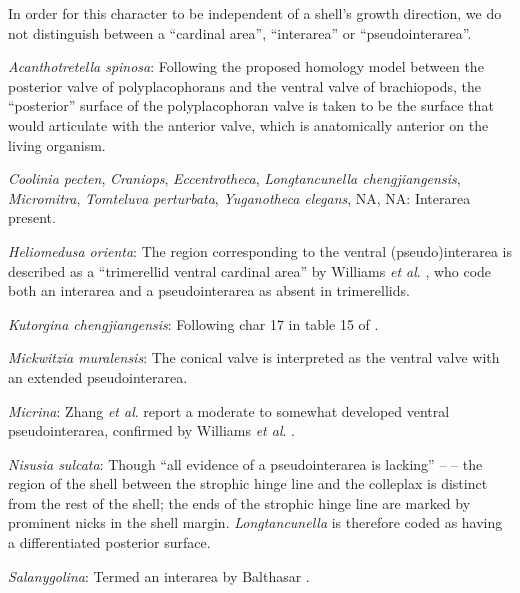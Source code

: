 \documentclass[openany]{book}
\theoremstyle{definition}
\theoremstyle{definition}
\theoremstyle{definition}
\theoremstyle{remark}
\begin{document}
In order for this character to be independent of a shell's growth
direction, we do not distinguish between a ``cardinal area'',
``interarea'' or ``pseudointerarea''.

\hypertarget{Acanthotretella_spinosa-coding-101}{}
\emph{Acanthotretella spinosa}: Following the proposed homology model
between the posterior valve of polyplacophorans and the ventral valve of
brachiopods, the ``posterior'' surface of the polyplacophoran valve is
taken to be the surface that would articulate with the anterior valve,
which is anatomically anterior on the living organism.

\hypertarget{Coolinia_pecten-coding-101}{}
\emph{Coolinia pecten}, \emph{Craniops}, \emph{Eccentrotheca},
\emph{Longtancunella chengjiangensis}, \emph{Micromitra},
\emph{Tomteluva perturbata}, \emph{Yuganotheca elegans}, NA, NA:
Interarea present.

\hypertarget{Heliomedusa_orienta-coding-101}{}
\emph{Heliomedusa orienta}: The region corresponding to the ventral
(pseudo)interarea is described as a ``trimerellid ventral cardinal
area'' by Williams \emph{et al}.
\citeyearpar[p.162]{Williams2000LinguliformeaCraniiformea}, who code
both an interarea and a pseudointerarea as absent in trimerellids.

\hypertarget{Kutorgina_chengjiangensis-coding-101}{}
\emph{Kutorgina chengjiangensis}: Following char 17 in table 15 of
\citet{Williams2000LinguliformeaCraniiformea}.

\hypertarget{Mickwitzia_muralensis-coding-101}{}
\emph{Mickwitzia muralensis}: The conical valve is interpreted as the
ventral valve with an extended pseudointerarea.

\hypertarget{Micrina-coding-101}{}
\emph{Micrina}: Zhang \emph{et al}.
\citeyearpar{Zhang2009Architectureand} report a moderate to somewhat
developed ventral pseudointerarea, confirmed by Williams \emph{et al}.
\citeyearpar{Williams2007Supplement}.

\hypertarget{Nisusia_sulcata-coding-101}{}
\emph{Nisusia sulcata}: Though ``all evidence of a pseudointerarea is
lacking'' -- \citet{Zhang2011Theexceptionally} -- the region of the
shell between the strophic hinge line and the colleplax \citep[fig. 2
in][]{Zhang2011Theexceptionally} is distinct from the rest of the shell;
the ends of the strophic hinge line are marked by prominent nicks in the
shell margin. \emph{Longtancunella} is therefore coded as having a
differentiated posterior surface.

\hypertarget{Salanygolina-coding-101}{}
\emph{Salanygolina}: Termed an interarea by Balthasar
\citeyearpar{Balthasar2004Shellstructure}.
\end{document}
